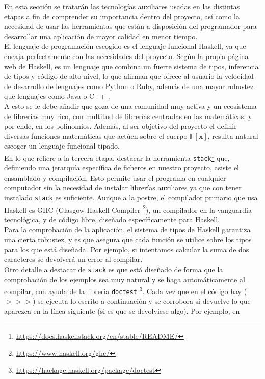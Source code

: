 En esta sección se tratarán las tecnologías auxiliares usadas en las distintas etapas a fin de comprender su importancia dentro del proyecto, así como la necesidad de usar las herramientas que están a disposición del programador para desarrollar una aplicación de mayor calidad en menor tiempo.\\

El lenguaje de programación escogido es el lenguaje funcional Haskell, ya que encaja perfectamente con las necesidades del proyecto. Según la propia página web de Haskell, es un lenguaje que combina un fuerte sistema de tipos, inferencia de tipos y código de alto nivel, lo que afirman que ofrece al usuario la velocidad de desarrollo de lenguajes como Python o Ruby, además de una mayor robustez que lenguajes como Java o C++ .\\

A esto se le debe añadir que goza de una comunidad muy activa y un ecosistema de librerías muy rico, con multitud de librerías centradas en las matemáticas, y por ende, en los polinomios. Además, al ser objetivo del proyecto el definir diversas funciones matemáticas que actúen sobre el cuerpo $\mathbb{F} [\textbf{x}]$, resulta natural escoger un lenguaje funcional tipado.\\

En lo que refiere a la tercera etapa, destacar la herramienta \texttt{stack}\footnote{\url{https://docs.haskellstack.org/en/stable/README/}} que, definiendo una jerarquía específica de ficheros en nuestro proyecto, asiste el ensamblado y compilación. Esto permite usar el programa en cualquier computador sin la necesidad de instalar librerías auxiliares ya que con tener instalado \texttt{stack} es suficiente. Aunque a la postre, el compilador primario que usa Haskell es GHC (Glasgow Haskell Compiler \footnote{\url{https://www.haskell.org/ghc/}}), un compilador en la vanguardia tecnológica, y de código libre, diseñado específicamente para Haskell.\\

Para la comprobación de la aplicación, el sistema de tipos de Haskell garantiza una cierta robustez, y es que asegura que cada función se utilice sobre los tipos para los que está diseñada. Por ejemplo, si intentamos calcular la suma de dos caracteres se devolverá un error al compilar.\\

Otro detalle a destacar de \texttt{stack} es que está diseñado de forma que la comprobación de los ejemplos sea muy natural y se haga automáticamente al compilar, con ayuda de la librería \texttt{doctest} \footnote{\url{https://hackage.haskell.org/package/doctest}}. Cada vez que en el código hay ($>>>$) se ejecuta lo escrito a continuación y se corrobora si devuelve lo que aparezca en la línea siguiente (si es que se devolviese algo). Por ejemplo, en

